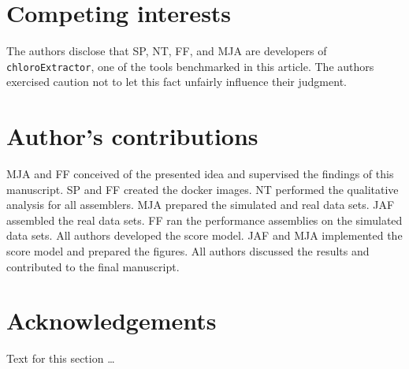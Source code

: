 \documentclass{bmcart}
\newcommand{\formatprogramnames}[1]{\texttt{#1}}
\newcommand{\ce}{\formatprogramnames{chloroExtractor}}
\begin{document}

\begin{backmatter}

\section*{Competing interests}
  The authors disclose that SP, NT, FF, and MJA are developers of \ce{}, one of the tools benchmarked in this article. The authors exercised caution not to let this fact unfairly influence their judgment.

\section*{Author's contributions}
MJA and FF conceived of the presented idea and supervised the findings of this manuscript.
SP and FF created the docker images.
NT performed the qualitative analysis for all assemblers.
MJA prepared the simulated and real data sets.
JAF assembled the real data sets.
FF ran the performance assemblies on the simulated data sets.
All authors developed the score model.
JAF and MJA implemented the score model and prepared the figures.
All authors discussed the results and contributed to the final manuscript.

\section*{Acknowledgements}
  Text for this section \ldots


\end{backmatter}
\end{document}
